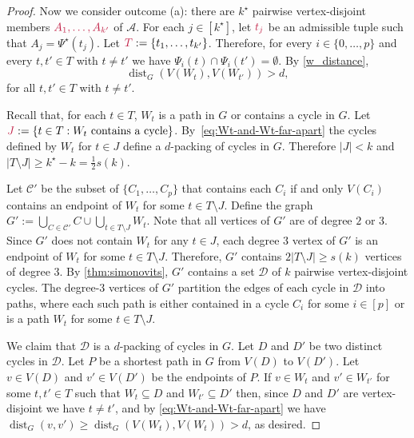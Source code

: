 \documentclass{patmorin}
\newcommand{\pat}[1]{\textcolor{Blue}{[Pat: #1]}}
\newcommand{\gwen}[1]{\textcolor{Purple}{Gwen: #1}}
\DeclareMathOperator{\dist}{dist}
\DeclarePairedDelimiter\set{\{}{\}}
\begin{document}
\begin{proof}
Now we consider outcome (a): 
there are $k^\star$ pairwise vertex-disjoint members $\mathdefin{A_1,\ldots,A_{k'}}$ of $\mathcal{A}$. 
For each $j\in[k^\star]$, let $\mathdefin{t_j}$ be an admissible tuple such that $A_j = \Psi^\star(t_j)$. 
Let $\mathdefin{T}:=\set{t_1,\ldots, t_{k'}}$. 
Therefore, for every $i\in\{0,\ldots,p\}$ 
and every $t,t'\in T$ with $t\neq t'$ we have $\Psi_i(t) \cap \Psi_i(t') = \emptyset$. 
By \cref{w_distance}, 
\begin{equation}\label{eq:Wt-and-Wt-far-apart}
\dist_G(V(W_{t}), V(W_{t'}))> d, 
\end{equation}
for all $t,t'\in T$ with $t\neq t'$. 

Recall that, for each $t\in T$, $W_t$ is a path in $G$ or contains a cycle in $G$. 
Let $\mathdefin{J}:=\{t\in T:\text{$W_t$ contains a cycle}\}$.  By~\eqref{eq:Wt-and-Wt-far-apart} the cycles defined by $W_t$ for $t\in J$ define a $d$-packing of cycles in $G$.  Therefore $|J|<k$ and $|T\setminus J|\geq k^\star-k= \tfrac{1}{2}s(k)$.

Let $\mathcal{C}'$ be the subset of $\{C_1,\ldots,C_p\}$ that contains each $C_i$ if and only $V(C_i)$ contains an endpoint of $W_t$ for some $t\in T\setminus J$.  Define the graph $G':=\bigcup_{C\in\mathcal{C}'} C\cup \bigcup_{t\in T\setminus J} W_{t}$.  
Note that all vertices of $G'$ are of degree $2$ or $3$.  Since $G'$ does not contain $W_t$ for any $t\in J$, each degree $3$ vertex of $G'$ is an endpoint of $W_{t}$ for some $t\in T\setminus J$. 
Therefore, $G'$ contains $2|T\setminus J|\geq s(k)$ vertices of degree $3$.
By \cref{thm:simonovits}, $G'$ contains a set $\mathcal{D}$ of $k$ pairwise vertex-disjoint cycles.  The degree-$3$ vertices of $G'$ partition the edges of each cycle in $\mathcal{D}$ into paths, where each such path is either contained in a cycle $C_i$ for some $i\in[p]$ or is a path $W_t$ for some $t\in T\setminus J$.  

We claim that $\mathcal{D}$ is a $d$-packing of cycles in $G$. 
Let $D$ and $D'$ be two distinct cycles in $\mathcal{D}$.  Let $P$ be a shortest path in $G$ from $V(D)$ to $V(D')$.  Let $v\in V(D)$ and $v'\in V(D')$ be the endpoints of $P$.  If $v\in W_t$ and $v'\in W_{t'}$ for some $t,t'\in T$ such that $W_t\subseteq D$ and $W_{t'}\subseteq D'$ then, 
since $D$ and $D'$ are vertex-disjoint we have $t\neq t'$, and by \eqref{eq:Wt-and-Wt-far-apart} we have $\dist_G(v,v')\ge \dist_G(V(W_t),V(W_t))>d$, as desired.  


\end{proof}
\end{document}
